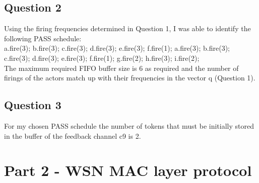 \documentclass[12pt]{article} %
\begin{document}

\subsection{Question 2} %
Using the firing frequencies determined in Question 1, I was able to identify the following PASS schedule: \\

a.fire(3); b.fire(3); c.fire(3); d.fire(3); e.fire(3); f.fire(1); a.fire(3); b.fire(3); c.fire(3); d.fire(3); e.fire(3); f.fire(1); g.fire(2); h.fire(3); i.fire(2);
\\

The maximum required FIFO buffer size is 6 as required and the number of firings of the actors match up with their frequencies in the vector q (Question 1).


\subsection{Question 3} %
For my chosen PASS schedule the number of tokens that must be initially stored in the buffer of the feedback channel c9 is \large 2.




\section{Part 2 - WSN MAC layer protocol} %


\end{document}
